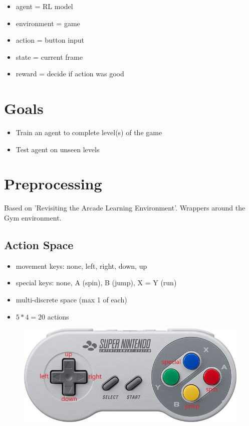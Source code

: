 \documentclass{article}
\begin{document}
    \begin{itemize}
        \item agent = RL model
        \item environment = game
        \item action = button input
        \item state = current frame
        \item reward = decide if action was good
    \end{itemize}

    \section{Goals}
    \begin{itemize}
        \item Train an agent to complete level(s) of the game
        \item Test agent on unseen levels
    \end{itemize}

    \section{Preprocessing}
    Based on 'Revisiting the Arcade Learning Environment'.
    Wrappers around the Gym environment.
    \subsection{Action Space}
    \begin{itemize}
        \item movement keys: none, left, right, down, up
        \item special keys: none, A (spin), B (jump), X = Y (run)
        \item multi-discrete space (max 1 of each)
        \item $5*4=20$ actions
    \end{itemize}
    \begin{figure}[H]
        \centering
        \includegraphics[width=.85\textwidth]{snes-controller-annot}
    \end{figure}
\end{document}
